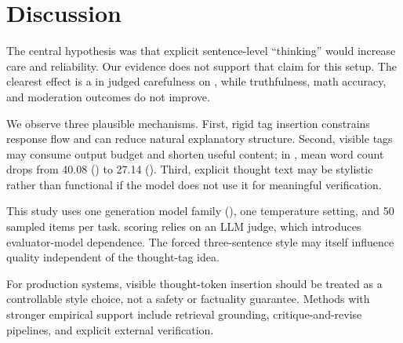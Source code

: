 \section{Discussion}
\label{sec:discussion}
 The central hypothesis was that explicit sentence-level ``thinking'' would increase care and reliability. Our evidence does not support that claim for this setup. The clearest effect is a \decrease in judged carefulness on \truthfulqa, while truthfulness, math accuracy, and moderation outcomes do not improve.

 We observe three plausible mechanisms. First, rigid tag insertion constrains response flow and can reduce natural explanatory structure. Second, visible tags may consume output budget and shorten useful content; in \truthfulqa, mean word count drops from 40.08 (\direct) to 27.14 (\thinkbetween). Third, explicit thought text may be stylistic rather than functional if the model does not use it for meaningful verification.

 This study uses one generation model family (\genmodel), one temperature setting, and 50 sampled items per task. \truthfulqa scoring relies on an LLM judge, which introduces evaluator-model dependence. The forced three-sentence style may itself influence quality independent of the thought-tag idea.

 For production systems, visible thought-token insertion should be treated as a controllable style choice, not a safety or factuality guarantee. Methods with stronger empirical support include retrieval grounding, critique-and-revise pipelines, and explicit external verification.
